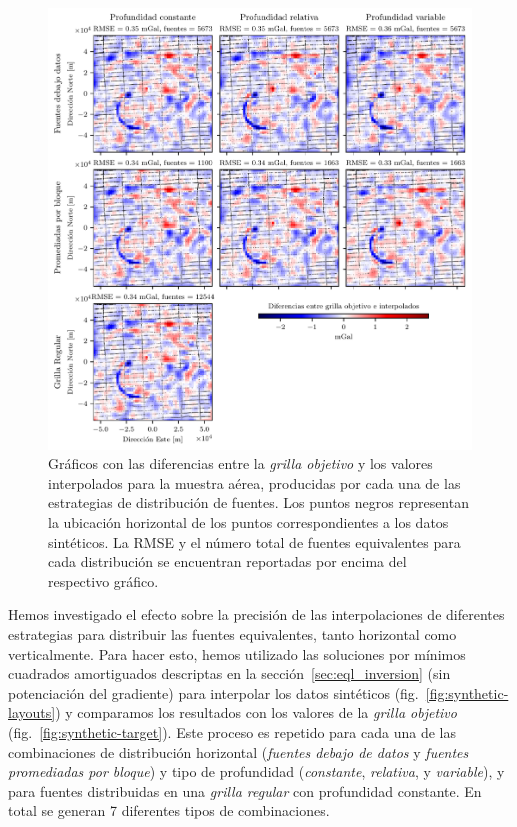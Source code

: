 \begin{figure}[p]
    \includegraphics[width=\linewidth]{figs/eql-gradient-boosted/airborne_survey_differences.pdf}
    \caption{
        Gráficos con las diferencias entre la \emph{grilla objetivo} y los
        valores interpolados para la muestra aérea, producidas por
        cada una de las estrategias de distribución de fuentes.
        Los puntos negros representan la ubicación horizontal de los puntos
        correspondientes a los datos sintéticos.
        La \acs{RMSE} y el número total de fuentes equivalentes para cada
        distribución se encuentran reportadas por encima del respectivo
        gráfico.
    }
    \label{fig:airborne-survey-differences}
\end{figure}

Hemos investigado el efecto sobre la precisión de las interpolaciones de
diferentes estrategias para distribuir las fuentes equivalentes, tanto
horizontal como verticalmente.
Para hacer esto, hemos utilizado las soluciones por mínimos cuadrados
amortiguados descriptas en la sección~\ref{sec:eql_inversion} (sin potenciación
del gradiente) para interpolar los datos sintéticos
(fig.~\ref{fig:synthetic-layouts}) y comparamos los resultados con los valores
de la \emph{grilla objetivo} (fig.~\ref{fig:synthetic-target}).
Este proceso es repetido para cada una de las combinaciones de distribución
horizontal (\emph{fuentes debajo de datos} y \emph{fuentes promediadas por
bloque}) y tipo de profundidad (\emph{constante}, \emph{relativa},
y \emph{variable}), y para fuentes distribuidas en una \emph{grilla regular}
con profundidad constante.
En total se generan 7 diferentes tipos de combinaciones.

